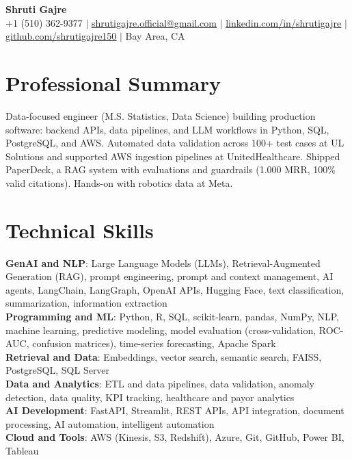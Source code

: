 \documentclass[letterpaper,10pt]{article}
\begin{document}
\begin{center}
  \textbf{\Huge Shruti Gajre} \\ \vspace{1pt}
  \small +1 (510) 362-9377 $|$
  \href{mailto:shrutigajre.official@gmail.com}{\underline{shrutigajre.official@gmail.com}} $|$
  \href{https://linkedin.com/in/shrutigajre}{\underline{linkedin.com/in/shrutigajre}} $|$
  \href{https://github.com/shrutigajre150}{\underline{github.com/shrutigajre150}} $|$
  Bay Area, CA
\end{center}

\section{Professional Summary}
{Data-focused engineer (M.S. Statistics, Data Science) building production software: backend APIs, data pipelines, and LLM workflows in Python, SQL, PostgreSQL, and AWS. Automated data validation across 100+ test cases at UL Solutions and supported AWS ingestion pipelines at UnitedHealthcare. Shipped PaperDeck, a RAG system with evaluations and guardrails (1.000 MRR, 100\% valid citations). Hands-on with robotics data at Meta.}

\section{Technical Skills}
\begin{itemize}[leftmargin=0.15in, label={}]
  {\item{
    \textbf{GenAI and NLP}{: Large Language Models (LLMs), Retrieval-Augmented Generation (RAG), prompt engineering, prompt and context management, AI agents, LangChain, LangGraph, OpenAI APIs, Hugging Face, text classification, summarization, information extraction} \\
    \textbf{Programming and ML}{: Python, R, SQL, scikit-learn, pandas, NumPy, NLP, machine learning, predictive modeling, model evaluation (cross-validation, ROC-AUC, confusion matrices), time-series forecasting, Apache Spark} \\
    \textbf{Retrieval and Data}{: Embeddings, vector search, semantic search, FAISS, PostgreSQL, SQL Server} \\
    \textbf{Data and Analytics}{: ETL and data pipelines, data validation, anomaly detection, data quality, KPI tracking, healthcare and payor analytics} \\
    \textbf{AI Development}{: FastAPI, Streamlit, REST APIs, API integration, document processing, AI automation, intelligent automation} \\
    \textbf{Cloud and Tools}{: AWS (Kinesis, S3, Redshift), Azure, Git, GitHub, Power BI, Tableau}
  }}
\end{itemize}
\end{document}
